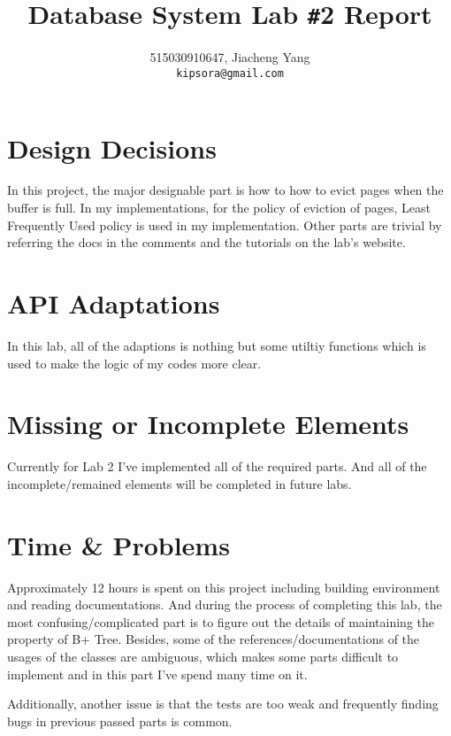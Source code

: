 \documentclass{article}
\title{Database System Lab \texttt{\#}2 Report}
\author{515030910647, Jiacheng Yang\\\texttt{kipsora@gmail.com}}
\begin{document}
    \maketitle
    \section{Design Decisions}
        In this project, the major designable part is how to how to evict pages when the buffer is full. In my implementations, for the policy of eviction of pages, Least Frequently Used policy is used in my implementation. Other parts are trivial by referring the docs in the comments and the tutorials on the lab's website.

    \section{API Adaptations}
    	In this lab, all of the adaptions is nothing but some utiltiy functions which is used to make the logic of my codes more clear.

    \section{Missing or Incomplete Elements}
        Currently for Lab 2 I've implemented all of the required parts. And all of the incomplete/remained elements will be completed in future labs.

    \section{Time \& Problems}
        Approximately 12 hours is spent on this project including building environment and reading documentations. And during the process of completing this lab, the most confusing/complicated part is to figure out the details of maintaining the property of B+ Tree. Besides, some of the references/documentations of the usages of the classes are ambiguous, which makes some parts difficult to implement and in this part I've spend many time on it. 

        Additionally, another issue is that the tests are too weak and frequently finding bugs in previous passed parts is common.
\end{document}
